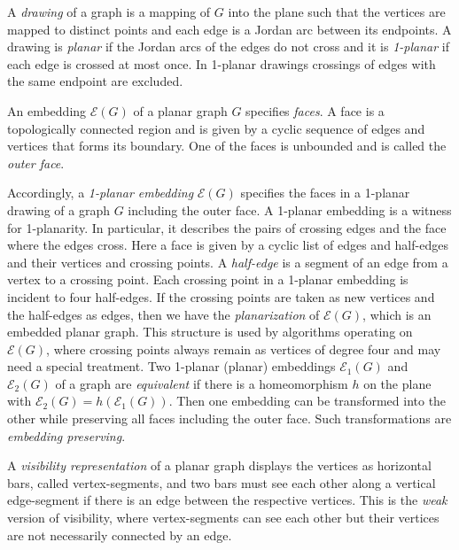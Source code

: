 \documentclass[runningheads]{llncs}
\begin{document}
A \emph{drawing} of a graph is a mapping of $G$ into the plane such
that the vertices are mapped to distinct points and each edge is a
Jordan arc between its endpoints. A drawing is \textit{planar} if
the Jordan arcs of the edges do not cross and it is
\textit{1-planar} if each edge is crossed at most once. In 1-planar
drawings  crossings of edges with the same endpoint are excluded.


An embedding $\mathcal{E}(G)$ of a planar graph $G$ specifies
\emph{faces}. A face is a topologically connected region and is
given by a cyclic sequence of edges and vertices  that forms its
boundary. One of the faces is unbounded and is called the
\emph{outer face}.

Accordingly, a \emph{1-planar embedding} $\mathcal{E}(G)$ specifies
the faces in a 1-planar drawing of a graph $G$ including the outer
face. A 1-planar embedding is a witness for 1-planarity.  In
particular, it describes the pairs of crossing edges and the face
where the edges cross. Here a face is given by a cyclic list of
edges and half-edges and their vertices and crossing points. A
\emph{half-edge} is a segment of an edge from a vertex to a crossing
point. Each crossing point in a 1-planar embedding is incident to
four half-edges. If the crossing points are taken as new vertices
and the half-edges  as  edges, then we have the \emph{planarization}
of $\mathcal{E}(G)$, which is an embedded planar graph. This
structure is used by algorithms operating on  $\mathcal{E}(G)$,
where crossing points always remain as vertices of degree four and
may need a special treatment. Two 1-planar (planar) embeddings
$\mathcal{E}_1(G)$ and $\mathcal{E}_2(G)$ of a graph are
\emph{equivalent} if there is a homeomorphism $h$ on the plane with
$\mathcal{E}_2(G) = h(\mathcal{E}_1(G))$. Then one embedding can be
transformed into the other while preserving all faces including the
outer face. Such transformations are \emph{embedding preserving}.


A  \emph{visibility representation} of a planar graph displays the
vertices as horizontal bars, called vertex-segments, and two bars
must see each other along a vertical edge-segment if there is an
edge between the respective vertices. This is the \emph{weak}
version of visibility, where vertex-segments can see each other but
their vertices are not necessarily connected by an edge.

\iffalse
 In the $\epsilon$-visibility the edges are represented by
vertical edge-segments of thickness $\epsilon
> 0$ and there is such a edge-segment if and only if there is an
edge. The strong version imposes an if and only if condition between
edges and visibility. For 2-connected graphs there is no essential
difference between weak and $\epsilon$-visibility \cite{TT-vrpg-86},
since   every weak visibility representation can be transformed into
an embedding preserving $\epsilon$-visibility representation with at
most twice the width of the drawing. \fi
\end{document}
